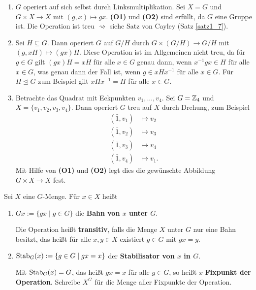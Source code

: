 \begin{beispiel}\label{beispiel3_3}
	\begin{enumerate}[label=(\arabic*)]
		\item $G$ operiert auf sich selbst durch Linksmultiplikation. Sei $X = G$ und $G \times X \to X$ mit $(g,x) \mapsto gx$. \textbf{(O1)} und \textbf{(O2)} sind erfüllt, da $G$ eine Gruppe ist. Die Operation ist treu $\rightsquigarrow$ siehe Satz von Cayley (Satz \ref{satz1_7}).
		
		\item Sei $H \subseteq G$. Dann operiert $G$ auf $G/H$ durch $G \times (G/H) \to G/H$ mit $(g,xH) \mapsto (gx)H$. Diese Operation ist im Allgemeinen nicht treu, da für $g \in G$ gilt $(gx)H = xH$ für alle $x \in G$ genau dann, wenn $x^{-1} g x \in H$ für alle $x \in G$, was genau dann der Fall ist, wenn $g \in x H x^{-1}$ für alle $x \in G$. Für $H \unlhd G$ zum Beispiel gilt $xHx^{-1} = H$ für alle $x \in G$.
		
		\item Betrachte das Quadrat mit Eckpunkten $v_1, \dots, v_4$. Sei $G = \mathbb{Z}_4$ und $X = \{v_1, v_2, v_3, v_4\}$. Dann operiert $G$ treu auf $X$ durch Drehung, zum Beispiel
		\begin{align*}
			(\bar{1}, v_1) &\mapsto v_2\\
			(\bar{1}, v_2) &\mapsto v_3\\
			(\bar{1}, v_3) &\mapsto v_4\\
			(\bar{1}, v_4) &\mapsto v_1.
		\end{align*}
		Mit Hilfe von \textbf{(O1)} und \textbf{(O2)} legt dies die gewünschte Abbildung $G \times X \to X$ fest.
	\end{enumerate}
\end{beispiel}
\begin{definition}
	Sei $X$ eine $G$-Menge. Für $x \in X$ heißt 
	\begin{enumerate}[label=(\alph*)]
		\item $Gx := \{gx \mid g \in G\}$ die \textbf{Bahn von $x$ unter $G$}. 
		
		Die Operation heißt \textbf{transitiv}, falls die Menge $X$ unter $G$ nur eine Bahn besitzt, das heißt für alle $x,y \in X$ existiert $g \in G$ mit $gx = y$.
		\item $\mathrm{Stab}_G(x) := \{g \in G \mid gx = x\}$ der \textbf{Stabilisator von $x$ in $G$}.
		
		Mit $\mathrm{Stab}_G(x) = G$, das heißt $gx = x$ für alle $g \in G$, so heißt $x$ \textbf{Fixpunkt der Operation}. Schreibe $X^G$ für die Menge aller Fixpunkte der Operation.
	\end{enumerate}
\end{definition}
